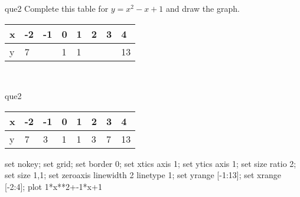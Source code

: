 \documentclass[13.5pt, varwidth=true]{beamer}
\begin{document}
\begin{frame}[shrink=19,fragile]
	\begin{beamercolorbox}[rounded=true, left, shadow=true,wd=14.8cm]{que2}
		 Complete this table for $y = x^{2} - x + 1$ and draw the graph. \\[0.3cm] \renewcommand{\arraystretch}{1.2}\begin{tabular}{|C|C|C|C|C|C|C|C|} \hline x & -2 & -1 & 0 & 1 & 2 & 3 & 4 \\ \hline y & 7 &  & 1 & 1 &  &  & 13\\ \hline \end{tabular}\\[0.3cm]
	\end{beamercolorbox}
\end{frame}
\begin{frame}[shrink=19,fragile]
	\begin{beamercolorbox}[rounded=true, left, shadow=true,wd=14.8cm]{que2}
		\renewcommand{\arraystretch}{1.2}\begin{tabular}{|C|C|C|C|C|C|C|C|} \hline x & -2 & -1 & 0 & 1 & 2 & 3 & 4 \\ \hline y & 7 & 3 & 1 & 1 & 3 & 7 & 13\\ \hline \end{tabular}\begin{gnuplot}[terminal=pdf] set nokey; set grid; set border 0; set xtics axis 1; set ytics axis 1; set size ratio 2; set size 1,1; set zeroaxis linewidth 2 linetype 1; set yrange [-1:13]; set xrange [-2:4]; plot 1*x**2+-1*x+1 \end{gnuplot}
	\end{beamercolorbox}
\end{frame}
\end{document}
